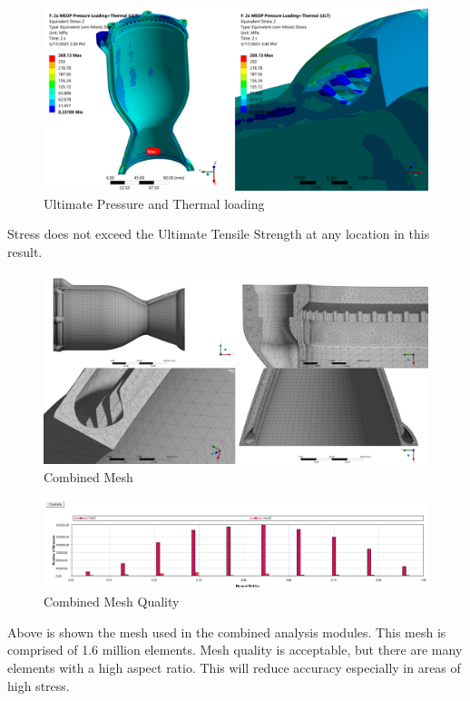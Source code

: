 \begin{figure}
    \centering
    \includegraphics[width=1\linewidth]{Images/Ultimate Pressure and Thermal loading.png}
    \caption{Ultimate Pressure and Thermal loading}
    \label{fig:Ultimate Pressure and Thermal loading}
\end{figure}
Stress does not exceed the Ultimate Tensile Strength at any location in this result. 
\begin{figure}
    \centering
    \includegraphics[width=1\linewidth]{Images/Combined Mesh.png}
    \caption{Combined Mesh}
    \label{fig:Combined Mesh}
\end{figure}
\begin{figure}
    \centering
    \includegraphics[width=1\linewidth]{Images/Combined Mesh Quality.png}
    \caption{Combined Mesh Quality}
    \label{fig:Combined Mesh Quality}
\end{figure}
Above is shown the mesh used in the combined analysis modules.  This mesh is comprised of 1.6 million elements. Mesh quality is acceptable, but there are many elements with a high aspect ratio. This will reduce accuracy especially in areas of high stress. 

